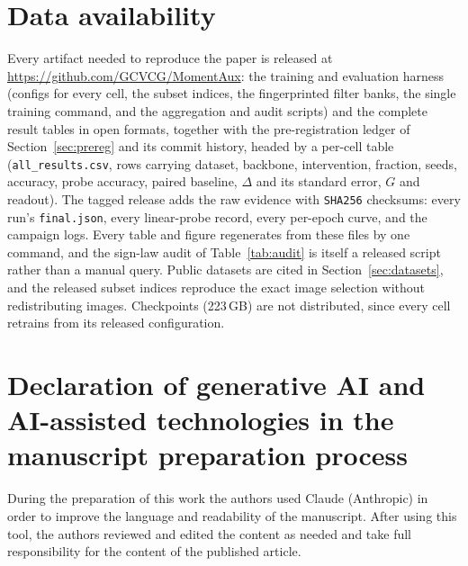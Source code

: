 \documentclass[a4paper,fleqn]{cas-dc}
\begin{document}
\section*{Data availability}
Every artifact needed to reproduce the paper is released at
\url{https://github.com/GCVCG/MomentAux}: the training and evaluation harness
(configs for every cell, the subset indices, the fingerprinted filter banks,
the single training command, and the aggregation and audit scripts) and the
complete result tables in open formats, together with the
pre-registration ledger of Section~\ref{sec:prereg} and its commit history,
headed by a per-cell table
(\texttt{all\_results.csv}, \computeCells{} rows carrying dataset, backbone,
intervention, fraction, seeds, accuracy, probe accuracy, paired baseline,
$\Delta$ and its standard error, $G$ and readout). The tagged release adds the
raw evidence with \texttt{SHA256} checksums: every run's \texttt{final.json},
every linear-probe record, every per-epoch curve, and the campaign logs. Every
table and figure regenerates from these files by one command, and the sign-law
audit of Table~\ref{tab:audit} is itself a released script rather than a
manual query. Public datasets are cited in Section~\ref{sec:datasets}, and the
released subset indices reproduce the exact image selection without
redistributing images. Checkpoints (223\,GB) are not distributed, since every
cell retrains from its released configuration.

\section*{Declaration of generative AI and AI-assisted technologies in the
manuscript preparation process}
During the preparation of this work the authors used Claude (Anthropic) in
order to improve the language and readability of the manuscript. After
using this tool, the authors reviewed and edited the content as needed and
take full responsibility for the content of the published article.





\end{document}
